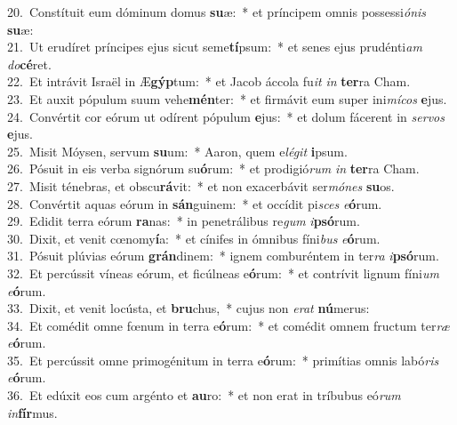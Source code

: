 {20.~}Constítuit eum dóminum domus \textbf{su}æ:~* et príncipem omnis possessi\textit{ó}\textit{nis} \textbf{su}æ:\\
{21.~}Ut erudíret príncipes ejus sicut seme\textbf{tí}psum:~* et senes ejus prudénti\textit{am} \textit{do}\textbf{cé}ret.\\
{22.~}Et intrávit Israël in Æ\textbf{gýp}tum:~* et Jacob áccola fu\textit{it} \textit{in} \textbf{ter}ra Cham.\\
{23.~}Et auxit pópulum suum vehe\textbf{mén}ter:~* et firmávit eum super ini\textit{mí}\textit{cos} \textbf{e}jus.\\
{24.~}Convértit cor eórum ut odírent pópulum \textbf{e}jus:~* et dolum fácerent in \textit{ser}\textit{vos} \textbf{e}jus.\\
{25.~}Misit Móysen, servum \textbf{su}um:~* Aaron, quem e\textit{lé}\textit{git} \textbf{i}psum.\\
{26.~}Pósuit in eis verba signórum su\textbf{ó}rum:~* et prodigió\textit{rum} \textit{in} \textbf{ter}ra Cham.\\
{27.~}Misit ténebras, et obscu\textbf{rá}vit:~* et non exacerbávit ser\textit{mó}\textit{nes} \textbf{su}os.\\
{28.~}Convértit aquas eórum in \textbf{sán}guinem:~* et occídit pi\textit{sces} \textit{e}\textbf{ó}rum.\\
{29.~}Edidit terra eórum \textbf{ra}nas:~* in penetrálibus re\textit{gum} \textit{i}\textbf{psó}rum.\\
{30.~}Dixit, et venit cœnomy\textbf{í}a:~* et cínifes in ómnibus fíni\textit{bus} \textit{e}\textbf{ó}rum.\\
{31.~}Pósuit plúvias eórum \textbf{grán}dinem:~* ignem comburéntem in ter\textit{ra} \textit{i}\textbf{psó}rum.\\
{32.~}Et percússit víneas eórum, et ficúlneas e\textbf{ó}rum:~* et contrívit lignum fíni\textit{um} \textit{e}\textbf{ó}rum.\\
{33.~}Dixit, et venit locústa, et \textbf{bru}chus,~* cujus non \textit{e}\textit{rat} \textbf{nú}merus:\\
{34.~}Et comédit omne fœnum in terra e\textbf{ó}rum:~* et comédit omnem fructum ter\textit{ræ} \textit{e}\textbf{ó}rum.\\
{35.~}Et percússit omne primogénitum in terra e\textbf{ó}rum:~* primítias omnis labó\textit{ris} \textit{e}\textbf{ó}rum.\\
{36.~}Et edúxit eos cum argénto et \textbf{au}ro:~* et non erat in tríbubus eó\textit{rum} \textit{in}\textbf{fír}mus.\\
